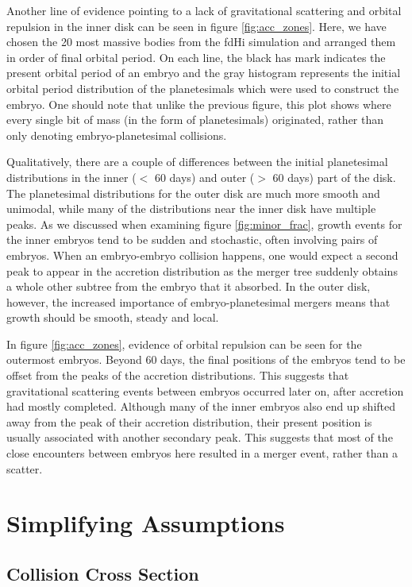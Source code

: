 \documentclass[twocolumn]{aastex63}
\begin{document}
Another line of evidence pointing to a lack of gravitational scattering and orbital repulsion in the inner disk can be seen in figure \ref{fig:acc_zones}. Here, we have chosen the 20 most massive bodies from the fdHi simulation and arranged them in order of final orbital period. On each line, the black has mark indicates the present orbital period of an embryo and the gray histogram represents the initial orbital period distribution of the planetesimals which were used to construct the embryo. One should note that unlike the previous figure, this plot shows where every single bit of mass (in the form of planetesimals) originated, rather than only denoting embryo-planetesimal collisions.

Qualitatively, there are a couple of differences between the initial planetesimal distributions in the inner ($<$ 60 days) and outer ($>$ 60 days) part of the disk. The planetesimal distributions for the outer disk are much more smooth and unimodal, while many of the distributions near the inner disk have multiple peaks. As we discussed when examining figure \ref{fig:minor_frac}, growth events for the inner embryos tend to be sudden and stochastic, often involving pairs of embryos. When an embryo-embryo collision happens, one would expect a second peak to appear in the accretion distribution as the merger tree suddenly obtains a whole other subtree from the embryo that it absorbed. In the outer disk, however, the increased importance of embryo-planetesimal mergers means that growth should be smooth, steady and local.

In figure \ref{fig:acc_zones}, evidence of orbital repulsion can be seen for the outermost embryos. Beyond 60 days, the final positions of the embryos tend to be offset from the peaks of the accretion distributions. This suggests that gravitational scattering events between embryos occurred later on, after accretion had mostly completed. Although many of the inner embryos also end up shifted away from the peak of their accretion distribution, their present position is usually associated with another secondary peak. This suggests that most of the close encounters between embryos here resulted in a merger event, rather than a scatter.

\section{Simplifying Assumptions}\label{sec:assump}

\subsection{Collision Cross Section}
\end{document}
